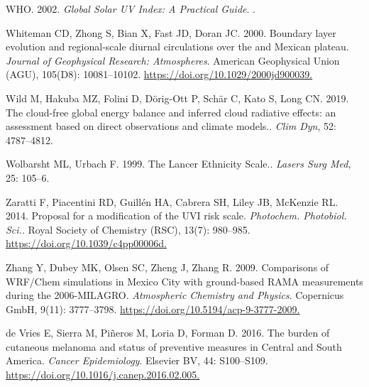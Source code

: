 \documentclass[10pt]{article}
\begin{document}
\label{csl:24}WHO. 2002. \textit{{Global Solar UV Index: A Practical Guide}}. .

\label{csl:6}Whiteman CD, Zhong S, Bian X, Fast JD, Doran JC. 2000. {Boundary layer evolution and regional-scale diurnal circulations over the and Mexican plateau}. \textit{Journal of Geophysical Research: Atmospheres}. American Geophysical Union ({AGU}), 105(D8): 10081–10102. \url{https://doi.org/10.1029/2000jd900039.}

\label{csl:70}Wild M, Hakuba MZ, Folini D, Dörig-Ott P, Schär C, Kato S, Long CN. 2019. {The cloud-free global energy balance and inferred cloud radiative effects: an assessment based on direct observations and climate models.}. \textit{Clim Dyn}, 52: 4787–4812.

\label{csl:45}Wolbarsht ML, Urbach F. 1999. {The Lancer Ethnicity Scale.}. \textit{Lasers Surg Med}, 25: 105–6.

\label{csl:26}Zaratti F, Piacentini RD, Guill{\'{e}}n HA, Cabrera SH, Liley JB, McKenzie RL. 2014. {Proposal for a modification of the {UVI} risk scale}. \textit{Photochem. Photobiol. Sci.}. Royal Society of Chemistry ({RSC}), 13(7): 980–985. \url{https://doi.org/10.1039/c4pp00006d.}

\label{csl:8}Zhang Y, Dubey MK, Olsen SC, Zheng J, Zhang R. 2009. {Comparisons of {WRF}/Chem simulations in Mexico City with ground-based {RAMA} measurements during the 2006-{MILAGRO}}. \textit{Atmospheric Chemistry and Physics}. Copernicus {GmbH}, 9(11): 3777–3798. \url{https://doi.org/10.5194/acp-9-3777-2009.}

\label{csl:39}de Vries E, Sierra M, Pi{\~{n}}eros M, Loria D, Forman D. 2016. {The burden of cutaneous melanoma and status of preventive measures in Central and South America}. \textit{Cancer Epidemiology}. Elsevier {BV}, 44: S100–S109. \url{https://doi.org/10.1016/j.canep.2016.02.005.}
\end{document}
